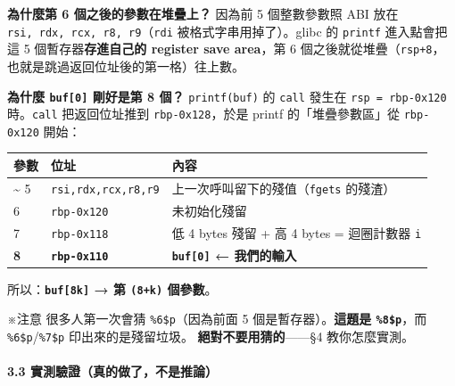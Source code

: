 \documentclass[10pt,a4paper]{article}
\newcounter{none}
\renewenvironment{quote}{%
  \begin{mdframed}[linewidth=0pt,innerleftmargin=0pt,innerrightmargin=0pt,
    innerbottommargin=0pt,innertopmargin=0pt,skipabove=0.55em,skipbelow=0.55em,
    leftmargin=0.9em,rightmargin=0.4em,startcode={\color{quotebar}\vrule width 2.6pt},%
    endcode={}]%
  \itshape\color{black}%
}{%
  \end{mdframed}%
}
\begin{document}
\textbf{為什麼第 6 個之後的參數在堆疊上？} 因為前 5 個整數參數照 ABI
放在 \texttt{rsi,\allowbreak{}\ \allowbreak{}rdx,\allowbreak{}\ \allowbreak{}rcx,\allowbreak{}\ \allowbreak{}r8,\allowbreak{}\ \allowbreak{}r9}（\texttt{rdi}
被格式字串用掉了）。glibc 的 \texttt{printf} 進入點會把這 5
個暫存器\textbf{存進自己的 register save area}，第 6
個之後就從堆疊（\texttt{rsp+8}，也就是跳過返回位址後的第一格）往上數。

\textbf{為什麼 \texttt{buf{[}0{]}} 剛好是第 8 個？} \texttt{printf(buf)}
的 \texttt{call} 發生在 \texttt{rsp\ \allowbreak{}=\ \allowbreak{}rbp-\allowbreak{}0x120} 時。\texttt{call}
把返回位址推到 \texttt{rbp-\allowbreak{}0x128}，於是 printf 的「堆疊參數區」從
\texttt{rbp-\allowbreak{}0x120} 開始：

{\def\LTcaptype{none} %
\begin{longtable}[]{@{}lll@{}}
\toprule\noalign{}
參數 & 位址 & 內容 \\
\midrule\noalign{}
\endhead
\bottomrule\noalign{}
\endlastfoot
1 \textasciitilde{} 5 & \texttt{rsi,\allowbreak{}rdx,\allowbreak{}rcx,\allowbreak{}r8,\allowbreak{}r9} &
上一次呼叫留下的殘值（\texttt{fgets} 的殘渣） \\
6 & \texttt{rbp-\allowbreak{}0x120} & 未初始化殘留 \\
7 & \texttt{rbp-\allowbreak{}0x118} & 低 4 bytes 殘留 + 高 4 bytes = 迴圈計數器
\texttt{i} \\
\textbf{8} & \textbf{\texttt{rbp-\allowbreak{}0x110}} & \textbf{\texttt{buf{[}0{]}} ←
我們的輸入} \\
\end{longtable}
}

所以：\textbf{\texttt{buf{[}8k{]}} → 第 \texttt{(8+k)} 個參數}。

\begin{quote}
※注意 很多人第一次會猜 \texttt{\%\allowbreak{}6\$\allowbreak{}p}（因為前面 5
個是暫存器）。\textbf{這題是 \texttt{\%\allowbreak{}8\$\allowbreak{}p}}，而
\texttt{\%\allowbreak{}6\$\allowbreak{}p}/\texttt{\%\allowbreak{}7\$\allowbreak{}p} 印出來的是殘留垃圾。
\textbf{絕對不要用猜的}------§4 教你怎麼實測。
\end{quote}

\paragraph{3.3
實測驗證（真的做了，不是推論）}\label{ux5be6ux6e2cux9a57ux8b49ux771fux7684ux505aux4e86ux4e0dux662fux63a8ux8ad6}
\end{document}
